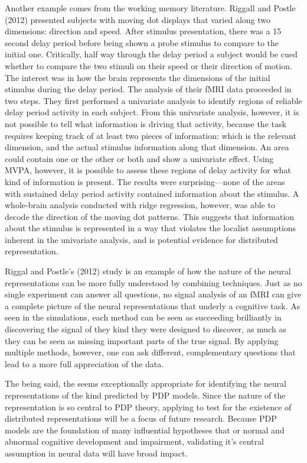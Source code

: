 Another example comes from the working memory literature. Riggall and Postle (2012) presented subjects with moving dot displays that varied along two dimensions: direction and speed. After stimulus presentation, there was a 15 second delay period before being shown a probe stimulus to compare to the initial one. Critically, half way through the delay period a subject would be cued whether to compare the two stimuli on their speed or their direction of motion. The interest was in how the brain represents the dimensions of the initial stimulus during the delay period. The analysis of their fMRI data proceeded in two steps. They first performed a univariate analysis to identify regions of reliable delay period activity in each subject. From this univariate analysis, however, it is not possible to tell what information is driving that activity, because the task requires keeping track of at least two pieces of information: which is the relevant dimension, and the actual stimulus information along that dimension. An area could contain one or the other or both and show a univariate effect. Using MVPA, however, it is possible to assess these regions of delay activity for what kind of information is present. The results were surprising---none of the areas with sustained delay period activity contained information about the stimulus. A whole-brain analysis conducted with ridge regression, however, was able to decode the direction of the moving dot patterns. This suggests that information about the stimulus is represented in a way that violates the localist assumptions inherent in the univariate analysis, and is potential evidence for distributed representation.

Riggal and Postle's (2012) study is an example of how the nature of the neural representations can be more fully understood by combining techniques. Just as no single experiment can answer all questions, no signal analysis of an fMRI can give a complete picture of the neural representations that underly a cognitive task. As seen in the simulations, each method can be seen as succeeding brilliantly in discovering the signal of they kind they were designed to discover, as much as they can be seen as missing important parts of the true signal. By applying multiple methods, however, one can ask different, complementary questions that lead to a more full appreciation of the data.

The being said, the \soslasso seems exceptionally appropriate for identifying the neural representations of the kind predicted by PDP models. Since the nature of the representation is so central to PDP theory, applying \soslasso to test for the existence of distributed representations will be a focus of future research. Because PDP models are the foundation of many influential hypotheses that or normal and abnormal cognitive development and impairment, validating it's central assumption in neural data will have broad impact.
